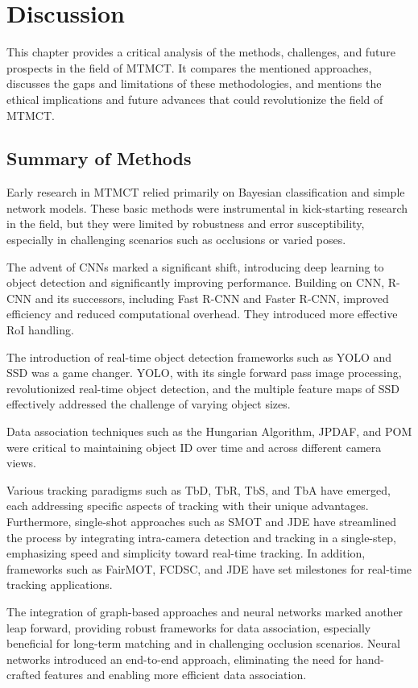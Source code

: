 \chapter{Discussion}\label{chap:discussion}
This chapter provides a critical analysis of the methods, challenges, and future prospects in the field of MTMCT. It compares the mentioned approaches, discusses the gaps and limitations of these methodologies, and mentions the ethical implications and future advances that could revolutionize the field of MTMCT.

\section{Summary of Methods}\label{sec:summary_of_methods}
Early research in MTMCT relied primarily on Bayesian classification and simple network models. These basic methods were instrumental in kick-starting research in the field, but they were limited by robustness and error susceptibility, especially in challenging scenarios such as occlusions or varied poses.

The advent of CNNs marked a significant shift, introducing deep learning to object detection and significantly improving performance. Building on CNN, R-CNN and its successors, including Fast R-CNN and Faster R-CNN, improved efficiency and reduced computational overhead. They introduced more effective RoI handling.

The introduction of real-time object detection frameworks such as YOLO and SSD was a game changer. YOLO, with its single forward pass image processing, revolutionized real-time object detection, and the multiple feature maps of SSD effectively addressed the challenge of varying object sizes.

Data association techniques such as the Hungarian Algorithm, JPDAF, and POM were critical to maintaining object ID over time and across different camera views.

Various tracking paradigms such as TbD, TbR, TbS, and TbA have emerged, each addressing specific aspects of tracking with their unique advantages. Furthermore, single-shot approaches such as SMOT and JDE have streamlined the process by integrating intra-camera detection and tracking in a single-step, emphasizing speed and simplicity toward real-time tracking. In addition, frameworks such as FairMOT, FCDSC, and JDE have set milestones for real-time tracking applications.

The integration of graph-based approaches and neural networks marked another leap forward, providing robust frameworks for data association, especially beneficial for long-term matching and in challenging occlusion scenarios. Neural networks introduced an end-to-end approach, eliminating the need for hand-crafted features and enabling more efficient data association.

